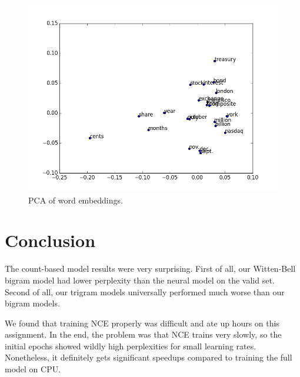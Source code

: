 \documentclass[11pt]{article}
\begin{document}
\begin{figure}[H]
\centering
\includegraphics[scale=0.5]{pca}
\caption{PCA of word embeddings.}
\label{fig:PCA}
\end{figure}

\section{Conclusion}

The count-based model results were very surprising. First of all, our Witten-Bell bigram model had lower perplexity than the neural model on the valid set. Second of all, our trigram models universally performed much worse than our bigram models. 

We found that training NCE properly was difficult and ate up hours on this assignment. In the end, the problem was that NCE trains very slowly, so the initial epochs showed wildly high perplexities for small learning rates. Nonetheless, it definitely gets significant speedups compared to training the full model on CPU. 


%
%
\end{document}

